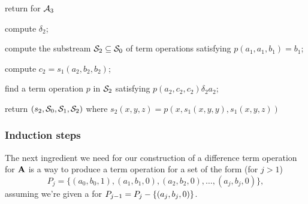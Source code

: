   \LinesNumbered
  \begin{algorithm}

    \caption{return \ldto for $\mathcal{A}_3$
    \label{alg:stream-ldt3}  }

  compute $\delta_2$;

  compute the substream $\mathcal{S}_2 \subseteq \mathcal{S}_0$ of term operations satisfying
   $p(a_1,a_1,b_1) = b_1$;

  compute $c_2 = s_1(a_2, b_2, b_2)$;

  find a term operation $p$ in $\mathcal{S}_2$ satisfying
  $p(a_2, c_2, c_2) \mathrel{\delta_2} a_2$;

  return $(s_2, \mathcal{S}_0, \mathcal{S}_1, \mathcal{S}_2)$ where $s_2(x,y,z) = p(x, s_1(x,y,y), s_1(x,y,z))$
  \end{algorithm}



















  \subsubsection{Induction steps}
  \label{sec:induct}

  The next ingredient we need for our construction of a
  difference term operation for $\mathbf{A}$
  is
  a way to produce a \ld
  term operation for a set of the form  (for $j>1$)
  \begin{equation}
  \label{eqn:Pj}
  P_j = \{(a_0, b_0, 1), (a_1, b_1, 0), (a_2, b_2, 0), \dots,
  (a_j, b_j, 0)\},
  \end{equation}
  assuming we're given a \ldto for $P_{j-1} = P_{j} - \{(a_j, b_j, 0)\}$.


  \begin{comment}
  \noindent \underline{\bf Subroutine \ild-0}\\[4pt]
  The input, $p$,  is
  a \ldto for $P_{j-1} = P_{j} \mysetminus \{(a_j, b_j, 0)\}$.
  \begin{enumerate}[1.]
  \item
  Call Subroutine \ld-2 to
  compute a \ldto $t$ for the set
  \begin{equation*}
  \{(a_0, b_0, 1), (a_j, p(a_j, b_j, b_j), 0)\}.
  \end{equation*}
  \item Return the following
  \ldto for $P_j$:
  \begin{equation}
  d(x,y,z) = t(x, p(x,y,y), p(x,y,z)).
  \label{eq:idl0-dto}
  \end{equation}
  \end{enumerate}
  \qed
  \end{comment}




